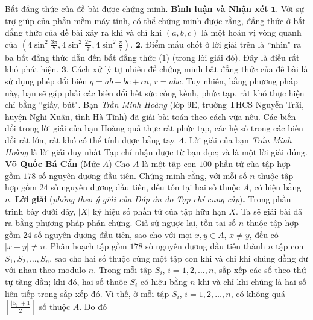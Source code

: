 \begin{multicols}{2}
	Bất đẳng thức của đề bài được chứng minh.
	\vskip 0.05cm
	\textbf{\color{thachthuctoanhoc}Bình luận và Nhận xét}
	\vskip 0.05cm
	$\pmb{1.}$ Với sự trợ giúp của phần mềm máy tính, có thể chứng minh được rằng, đẳng thức ở bất đẳng thức của đề bài xảy ra khi và chỉ khi $(a, b, c)$ là một hoán vị vòng quanh của  $\left( {4{{\sin }^2}\frac{{3\pi }}{7},4{{\sin }^2}\frac{{2\pi }}{7},4{{\sin }^2}\frac{\pi }{7}} \right)$.
	\vskip 0.05cm
	$\pmb{2.}$ Điểm mấu chốt ở lời giải trên là ``nhìn" ra ba bất đẳng thức dẫn đến bất đẳng thức ($1$) (trong lời giải đó). Đây là điều rất khó phát hiện.
	\vskip 0.05cm
	$\pmb{3.}$ Cách xử lý tự nhiên để chứng minh bất đẳng thức của đề bài là sử dụng phép đổi biến $q = ab + bc + ca$, $r = abc$. Tuy nhiên, bằng phương pháp này, bạn sẽ gặp phải các biến đổi hết sức cồng kềnh, phức tạp, rất khó thực hiện chỉ bằng ``giấy, bút". Bạn \textit{Trần Minh Hoàng} (lớp $9$E, trường THCS Nguyễn Trãi, huyện Nghi Xuân, tỉnh Hà Tĩnh) đã giải bài toán theo cách vừa nêu. Các biến đổi trong lời giải của bạn Hoàng quả thực rất phức tạp, các hệ số trong các biến đổi rất lớn, rất khó có thể tính được bằng tay. 
	\vskip 0.05cm
	$\pmb{4.}$ Lời giải của bạn \textit{Trần Minh Hoàng} là lời giải duy nhất Tạp chí nhận được từ bạn đọc; và là một lời giải đúng.
	\vskip 0.1cm
	\hfill	\textbf{\color{thachthuctoanhoc}Võ Quốc Bá Cẩn}
	\vskip 0.1cm
	{}
	(Mức $A$) Cho $A$ là một tập con $100$ phần tử của tập hợp gồm $178$ số nguyên dương đầu tiên. Chứng minh rằng, với mỗi số $n$ thuộc tập hợp gồm $24$ số nguyên dương đầu tiên, đều tồn tại hai số thuộc $A$, có hiệu bằng $n$.
	\vskip 0.05cm
	\textbf{\color{thachthuctoanhoc}Lời giải} (\textit{phỏng theo ý giải của Đáp án do Tạp chí cung cấp})\textbf{\color{thachthuctoanhoc}.}
	\vskip 0.05cm
	Trong phần trình bày dưới đây, $|X|$  ký hiệu số phần tử của tập hữu hạn $X$.
	\vskip 0.05cm
	Ta sẽ giải bài đã ra bằng phương pháp phản chứng.
	\vskip 0.05cm
	Giả sử ngược lại, tồn tại số $n$ thuộc tập hợp gồm $24$ số nguyên dương đầu tiên, sao cho với mọi $x, y \in A$, $x \ne y$, đều có $|x - y| \ne n$.
	\vskip 0.05cm 
	Phân hoạch tập gồm $178$ số nguyên dương đầu tiên thành $n$ tập con  $S_1,  S_2, \ldots,  S_n$, sao cho hai số thuộc cùng một tập con khi và chỉ khi chúng đồng dư với nhau theo modulo $n$.
	\vskip 0.05cm
	Trong mỗi tập  $S_i$, $i = 1, 2, \ldots, n$, sắp xếp các số theo thứ tự tăng dần; khi đó, hai số thuộc $S_i$  có hiệu bằng $n$ khi và chỉ khi chúng là hai số liên tiếp trong sắp xếp đó. Vì thế, ở mỗi tập  $S_i$, $i = 1, 2, \ldots, n$, có không quá $\left\lceil {\frac{{\left| {{S_i}} \right| + 1}}{2}} \right\rceil$  số thuộc $A$. Do đó

\end{multicols}
